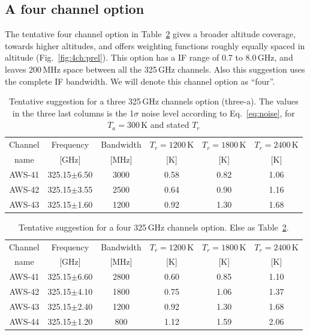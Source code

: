 \documentclass[12pt]{article}
\begin{document}
\subsection{A four channel option}
%
The tentative four channel option in Table~\ref{tab:chs:prel4} gives a broader
altitude coverage, towards higher altitudes, and offers weighting functions
roughly equally spaced in altitude (Fig.~\ref {fig:4ch:prel}). This option has
a IF range of 0.7 to 8.0\,GHz, and leaves 200\,MHz space between all the
325\,GHz channels. Also this suggestion uses the complete IF bandwidth. We will denote this channel option as ``four''.

\begin{table}[!p]
  \centering  
  \begin{tabular}[c]{c|c|c|ccc}
    Channel & Frequency   & Bandwidth & $T_r=1200$\,K
    & $T_r=1800$\,K & $T_r=2400$\,K\\
    name    & [GHz] &  [MHz] & [K]  & [K] & [K]\\
    \hline
    AWS-41  & 325.15$\pm$6.50 & 3000 & 0.58 & 0.82 & 1.06 \\
    AWS-42  & 325.15$\pm$3.55 & 2500 & 0.64 & 0.90 & 1.16 \\
    AWS-43  & 325.15$\pm$1.60 & 1200 & 0.92 & 1.30 & 1.68 \\
    \hline
  \end{tabular}
  \caption{Tentative suggestion for a three 325\,GHz channels option (three-a). The
    values in the three last columns is the 1$\sigma$ noise level according to
    Eq.~\ref{eq:noise}, for $T_a=300$\,K and stated $T_r$ }
  \label{tab:chs:prel3}
\end{table}

\begin{table}[!p]
  \centering  
  \begin{tabular}[c]{c|c|c|ccc}
    Channel & Frequency   & Bandwidth & $T_r=1200$\,K
    & $T_r=1800$\,K & $T_r=2400$\,K\\
    name    & [GHz] &  [MHz] & [K]  & [K] & [K]\\
    \hline
    AWS-41  & 325.15$\pm$6.60 & 2800 & 0.60 & 0.85 & 1.10 \\
    AWS-42  & 325.15$\pm$4.10 & 1800 & 0.75 & 1.06 & 1.37 \\
    AWS-43  & 325.15$\pm$2.40 & 1200 & 0.92 & 1.30 & 1.68 \\
    AWS-44  & 325.15$\pm$1.20 & \phantom{0}800 & 1.12 & 1.59 & 2.06\\
    \hline
  \end{tabular}
  \caption{Tentative suggestion for a four 325\,GHz channels option. Else as
    Table~\ref{tab:chs:prel4}.}
  \label{tab:chs:prel4}
\end{table}
\end{document}
